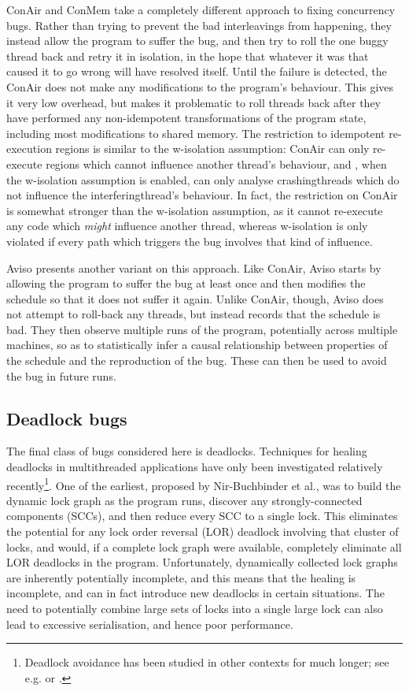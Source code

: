 ConAir\cite{Zhang2013} and ConMem\cite{Zhang2010} take a completely
different approach to fixing concurrency bugs.  Rather than trying to
prevent the bad interleavings from happening, they instead allow the
program to suffer the bug, and then try to roll the one buggy thread
back and retry it in isolation, in the hope that whatever it was that
caused it to go wrong will have resolved itself.  Until the failure is
detected, the ConAir does not make any modifications to the program's
behaviour.  This gives it very low overhead, but makes it problematic
to roll threads back after they have performed any non-idempotent
transformations of the program state, including most modifications to
shared memory.  The restriction to idempotent re-execution regions is
similar to the \gls{w-isolation} assumption: ConAir can only
re-execute regions which cannot influence another thread's behaviour,
and {\technique}, when the \gls{w-isolation} assumption is enabled,
can only analyse \glspl{crashingthread} which do not influence the
\gls{interferingthread}'s behaviour.  In fact, the restriction on
ConAir is somewhat stronger than the \gls{w-isolation} assumption, as
it cannot re-execute any code which \emph{might} influence another
thread, whereas \gls{w-isolation} is only violated if every path which
triggers the bug involves that kind of influence.

Aviso\cite{Lucia2013} presents another variant on this approach.
Like ConAir, Aviso starts by allowing the program to suffer the bug at
least once and then modifies the schedule so that it does not suffer
it again.  Unlike ConAir, though, Aviso does not attempt to roll-back
any threads, but instead records that the schedule is bad.  They then
observe multiple runs of the program, potentially across multiple
machines, so as to statistically infer a causal relationship between
properties of the schedule and the reproduction of the bug.  These can
then be used to avoid the bug in future runs.

\subsection{Deadlock bugs}
The final class of bugs considered here is deadlocks.  Techniques for
healing deadlocks in multithreaded applications have only been
investigated relatively recently\footnote{Deadlock avoidance has been
  studied in other contexts for much longer; see
  e.g. \cite{Dijkstra2004} or \cite{Viswanadham1990}.}.  One of the
earliest, proposed by Nir-Buchbinder et al.\cite{Nir-Buchbinder2008},
was to build the dynamic lock graph as the program runs, discover any
strongly-connected components (SCCs), and then reduce every SCC to a
single lock.  This eliminates the potential for any lock order
reversal (LOR) deadlock involving that cluster of locks, and would, if
a complete lock graph were available, completely eliminate all LOR
deadlocks in the program.  Unfortunately, dynamically collected lock
graphs are inherently potentially incomplete, and this means that the
healing is incomplete, and can in fact introduce new deadlocks in
certain situations.  The need to potentially combine large sets of
locks into a single large lock can also lead to excessive
serialisation, and hence poor performance.

